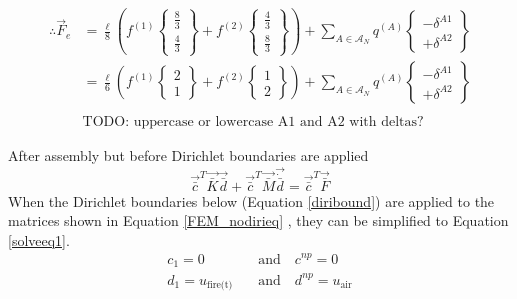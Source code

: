 \begin{equation}\label{Feass6}
\begin{aligned}
\therefore \vec{F}_e &= \frac{\ell}{8} \left(
	f^{(1)} \begin{Bmatrix} \frac{8}{3} \\ \frac{4}{3} \end{Bmatrix}
	+ f^{(2)} \begin{Bmatrix} \frac{4}{3} \\ \frac{8}{3} \end{Bmatrix}
\right)
+ \sum_{A \in \mathcal{A}_N} q^{(A)} \begin{Bmatrix} -\delta^{A1} \\ +\delta^{A2} \end{Bmatrix} \\
&= \frac{\ell}{6} \left(
	f^{(1)} \begin{Bmatrix} 2 \\ 1 \end{Bmatrix}
	+ f^{(2)} \begin{Bmatrix} 1 \\ 2 \end{Bmatrix}
\right)
+ \sum_{A \in \mathcal{A}_N} q^{(A)} \begin{Bmatrix} -\delta^{A1} \\ +\delta^{A2} \end{Bmatrix} \\\\
& \text{TODO:  uppercase or lowercase A1 and A2 with deltas?}
\end{aligned}
\end{equation}


After assembly but before Dirichlet boundaries are applied 
\begin{equation}\label{FEM_nodirieq}
\vec{\bar{c}}^T \vec{\bar{K}} \vec{\bar{d}} + \vec{\bar{c}}^T \vec{\bar{M}} \vec{\dot{\bar{d}}} = \vec{\bar{c}}^T \vec{\bar{F}}
\end{equation}
When the Dirichlet boundaries below (Equation \ref{diribound}) are applied to the matrices shown in Equation \ref{FEM_nodirieq} , they can be simplified to Equation \ref{solveeq1}.
\begin{equation}\label{diribound}
\begin{aligned}
c_1 = 0 \quad &\text{and} \quad c^{np}=0\\
d_1 = u_{\text{fire(t)}}\quad &\text{and} \quad d^{np} = u_{\text{air}}\\
\end{aligned}
\end{equation}

